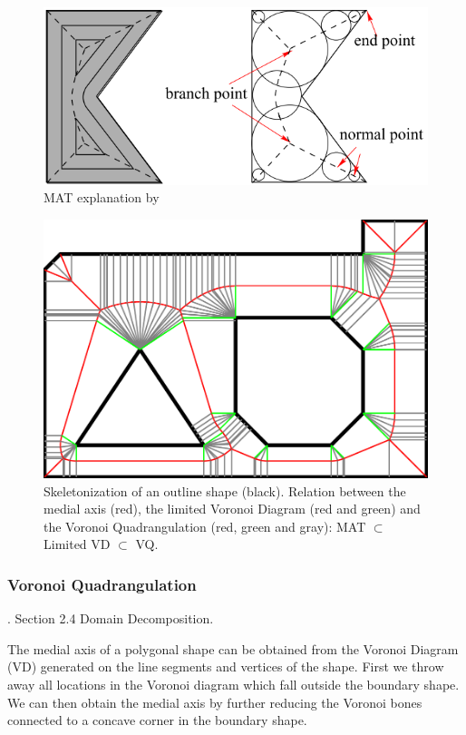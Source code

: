 \begin{figure}
\centering
\includegraphics[width=.9\columnwidth]{sources/intro/medial_axis_Kao.png}
\caption{MAT explanation by \citeauthor{kao1998optimal}}
\label{MAT_explanation}
\end{figure}


\begin{figure}
\includegraphics[width=\columnwidth]{sources/method/MAT_VD_VQ.pdf}
\caption{
Skeletonization of an outline shape (black).
Relation between the medial axis (red), the limited Voronoi Diagram (red and green) and the Voronoi Quadrangulation (red, green and gray): MAT $\subset$ Limited VD $\subset$ VQ.
}
\label{skeletonization_comparison}
\end{figure}



\subsubsection{Voronoi Quadrangulation}
 \cite{Ding2016a}. Section 2.4 Domain Decomposition.

The medial axis of a polygonal shape can be obtained from the Voronoi Diagram (VD) generated on the line segments and vertices of the shape. \cite{lee1982medial}
First we throw away all locations in the Voronoi diagram which fall outside the boundary shape.
We can then obtain the medial axis by further reducing the Voronoi bones connected to a concave corner in the boundary shape.

